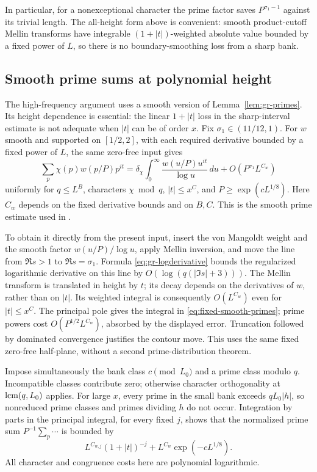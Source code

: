 In particular, for a nonexceptional character the prime factor saves
\(P^{\sigma_1-1}\) against its trivial length.  The all-height form
above is convenient: smooth product-cutoff Mellin transforms have
integrable \((1+|t|)\)-weighted absolute value bounded by a fixed
power of \(L\), so there is no boundary-smoothing loss from a sharp bank.


\subsection{Smooth prime sums at polynomial height}


The high-frequency argument uses a smooth version of
Lemma~\ref{lem:gr-primes}. Its height dependence is essential:
the linear \(1+|t|\) loss in the sharp-interval estimate is not
adequate when \(|t|\) can be of order \(x\).
Fix \(\sigma_1\in(11/12,1)\). For \(w\) smooth and supported on
\([1/2,2]\), with each required derivative bounded by a fixed
power of \(L\), the same zero-free input gives
\begin{equation}\label{eq:fixed-smooth-primes}
 \sum_p\chi(p)w(p/P)p^{it}
  =\delta_\chi\int_0^\infty\frac{w(u/P)u^{it}}{\log u}\,du
                       +O(P^{\sigma_1}L^{C_w})
\end{equation}
uniformly for \(q\le L^B\), characters \(\chi\bmod q\),
\(|t|\le x^C\), and \(P\ge\exp(cL^{1/8})\).
Here \(C_w\) depends on the fixed derivative bounds and on \(B,C\).
This is the smooth prime estimate used in
\cite[Lemma 5.1 and Section 6.4]{walsh}.

To obtain it directly from the present input, insert the von
Mangoldt weight and the smooth factor \(w(u/P)/\log u\), apply
Mellin inversion, and move the line from \(\Re s>1\) to
\(\Re s=\sigma_1\). Formula \eqref{eq:gr-logderivative} bounds
the regularized logarithmic derivative on this line by
\(O(\log(q(|\Im s|+3)))\). The Mellin transform is translated
in height by \(t\); its decay depends on the derivatives of
\(w\), rather than on \(|t|\). Its weighted integral is consequently
\(O(L^{C_w})\) even for \(|t|\le x^C\). The principal pole
gives the integral in \eqref{eq:fixed-smooth-primes}; prime powers
cost \(O(P^{1/2}L^{C_w})\), absorbed by the displayed error.
Truncation followed by dominated convergence justifies the contour
move. This uses the same fixed zero-free half-plane, without a
second prime-distribution theorem.

Impose simultaneously the bank class \(c\pmod{L_0}\) and a
prime class modulo \(q\). Incompatible classes contribute zero;
otherwise character orthogonality at \(\operatorname{lcm}(q,L_0)\) applies.
For large \(x\), every prime in the small bank exceeds
\(qL_0|h|\), so nonreduced prime classes and primes dividing
\(h\) do not occur. Integration by parts in the principal
integral, for every fixed \(j\), shows that the normalized
prime sum \(P^{-1}\sum_p\cdots\) is bounded by
\begin{equation}\label{eq:fixed-high-prime}
        L^{C_{w,j}}(1+|t|)^{-j}
                       +L^{C_w}\exp(-cL^{1/8}).
\end{equation}
All character and congruence costs here are polynomial logarithmic.


